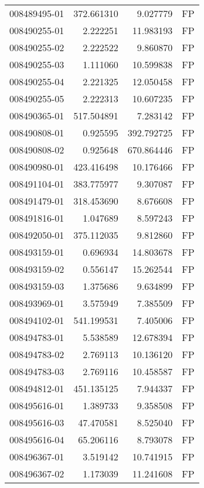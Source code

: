 \begin{tabular}{lrrl}
008489495-01 &  372.661310 &       9.027779 &   FP \\
008490255-01 &    2.222251 &      11.983193 &   FP \\
008490255-02 &    2.222522 &       9.860870 &   FP \\
008490255-03 &    1.111060 &      10.599838 &   FP \\
008490255-04 &    2.221325 &      12.050458 &   FP \\
008490255-05 &    2.222313 &      10.607235 &   FP \\
008490365-01 &  517.504891 &       7.283142 &   FP \\
008490808-01 &    0.925595 &     392.792725 &   FP \\
008490808-02 &    0.925648 &     670.864446 &   FP \\
008490980-01 &  423.416498 &      10.176466 &   FP \\
008491104-01 &  383.775977 &       9.307087 &   FP \\
008491479-01 &  318.453690 &       8.676608 &   FP \\
008491816-01 &    1.047689 &       8.597243 &   FP \\
008492050-01 &  375.112035 &       9.812860 &   FP \\
008493159-01 &    0.696934 &      14.803678 &   FP \\
008493159-02 &    0.556147 &      15.262544 &   FP \\
008493159-03 &    1.375686 &       9.634899 &   FP \\
008493969-01 &    3.575949 &       7.385509 &   FP \\
008494102-01 &  541.199531 &       7.405006 &   FP \\
008494783-01 &    5.538589 &      12.678394 &   FP \\
008494783-02 &    2.769113 &      10.136120 &   FP \\
008494783-03 &    2.769116 &      10.458587 &   FP \\
008494812-01 &  451.135125 &       7.944337 &   FP \\
008495616-01 &    1.389733 &       9.358508 &   FP \\
008495616-03 &   47.470581 &       8.525040 &   FP \\
008495616-04 &   65.206116 &       8.793078 &   FP \\
008496367-01 &    3.519142 &      10.741915 &   FP \\
008496367-02 &    1.173039 &      11.241608 &   FP \\

\end{tabular}
